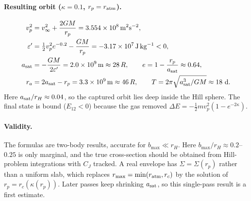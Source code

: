 \documentclass{article}
\begin{document}
\paragraph{Resulting orbit ($\kappa=0.1$, $r_p=r_{\rm atm}$).}
\begin{align}
v_p^{2}&=v_\infty^{2}+\frac{2GM}{r_p}=3.554\times10^{8}\,\mathrm{m^{2}s^{-2}},\\
\varepsilon'&=\tfrac12 v_p^{2}e^{-0.2}-\frac{GM}{r_p}=-3.17\times10^{7}\,\mathrm{J\,kg^{-1}}<0,\\
a_{\rm sat}&=-\frac{GM}{2\varepsilon'}=2.0\times10^{9}\,\mathrm{m}\approx28\,R,\qquad
e=1-\frac{r_p}{a_{\rm sat}}\approx0.64,\\
r_a&=2a_{\rm sat}-r_p=3.3\times10^{9}\,\mathrm{m}\approx46\,R,\qquad
T=2\pi\sqrt{a_{\rm sat}^{3}/GM}\approx18\ \mathrm{d}.
\end{align}
Here $a_{\rm sat}/r_H\approx0.04$, so the captured orbit lies deep inside the Hill sphere.
The final state is bound ($E_{12}<0$) because the gas removed $\Delta E=-\tfrac12 m v_p^{2}(1-e^{-2\kappa})$.

\paragraph{Validity.}
The formulas are two-body results, accurate for $b_{\max}\ll r_H$. Here $b_{\max}/r_H\approx0.2$--$0.25$ is only
marginal, and the true cross-section should be obtained from Hill-problem integrations
with $C_J$ tracked. A real envelope has $\Sigma=\Sigma(r_p)$ rather than a uniform slab,
which replaces $r_{\max}=\min(r_{\rm atm},r_c)$ by the solution of $r_p=r_c(\kappa(r_p))$.
Later passes keep shrinking $a_{\rm sat}$, so this single-pass result is a first estimate.
\end{document}
